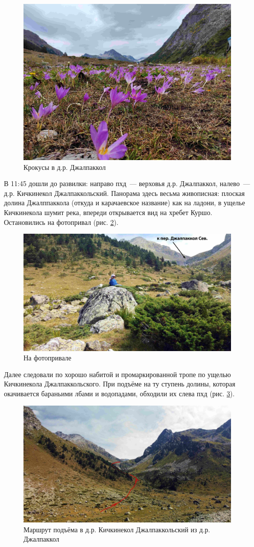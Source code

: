 \begin{figure}[h!]
	\centering
	\includegraphics[width=0.7\linewidth]{../pics/IMG_20240822_101505}
	\caption{Крокусы в д.р. Джалпаккол}
	\label{fig:IMG_20240822_101505}
\end{figure}

В 11:45 дошли до развилки: направо пхд~--- верховья д.р. Джалпаккол, налево~--- д.р. Кичкинекол Джалпаккольский. Панорама здесь весьма живописная: плоская долина Джалппаккола (откуда и карачаевское название) как на ладони, в ущелье Кичкинекола шумит река, впереди открывается вид на хребет Куршо. Остановились на фотопривал (рис. \ref{fig:DJI_0830}).

\begin{figure}[h!]
	\centering
	\includegraphics[width=0.7\linewidth]{../pics/DJI_0830}
	\caption{На фотопривале}
	\label{fig:DJI_0830}
\end{figure}

Далее следовали по хорошо набитой и промаркированной тропе по ущелью Кичкинекола Джалпаккольского. При подъёме на ту ступень долины, которая окачивается бараньими лбами и водопадами, обходили их слева пхд (рис. \ref{fig:DJI_0835}).


\begin{figure}[h!]
	\centering
	\includegraphics[width=0.7\linewidth]{../pics/DJI_0835}
	\caption{Маршрут подъёма в д.р. Кичкинекол Джалпаккольский из д.р. Джалпаккол}
	\label{fig:DJI_0835}
\end{figure}

